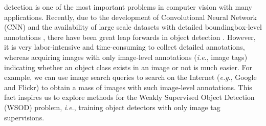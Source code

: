 \documentclass[10pt,journal,compsoc]{IEEEtran}
\def\eg{\emph{e.g}.} \def\Eg{\emph{E.g}.}
\def\ie{\emph{i.e}.} \def\Ie{\emph{I.e}.}
\begin{document}
\IEEEdisplaynontitleabstractindextext



%
\IEEEpeerreviewmaketitle



 detection is one of the most important problems in computer vision with many applications.
Recently, due to the development of Convolutional Neural Network (CNN) \cite{Ref:Lecun1998,Ref:Krizhevsky2012} and the availability of large scale datasets with detailed boundingbox-level annotations \cite{Ref:Everingham2015,Ref:Russakovsky2015,Ref:Lin2014},
there have been great leap forwards in object detection \cite{Ref:Girshick2016,Ref:Girshick2015,Ref:Ren2017,Ref:Redmon2016,Ref:Liu2016,Ref:Zhang2018}.
However, it is very labor-intensive and time-consuming to collect detailed annotations,
whereas acquiring images with only image-level annotations (\ie, image tags) indicating whether an object class exists in an image or not is much easier.
For example, we can use image search queries to search on the Internet (\eg, Google and Flickr) to obtain a mass of images with such image-level annotations.
This fact inspires us to explore methods for the Weakly Supervised Object Detection (WSOD) problem, \ie, training object detectors with only image tag supervisions.
\end{document}
